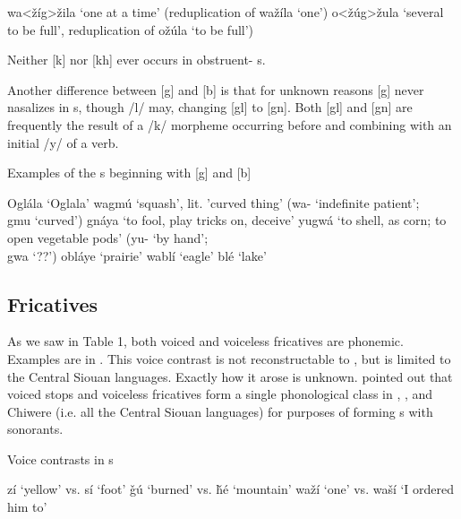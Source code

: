 \documentclass[output=paper]{LSP/langsci}
\begin{document}
\begin{exe}
\ex\label{ex:rood:2}
 \begin{xlist}
\ex wa<\v{z}íg>\v{z}ila `one at a time' (reduplication of wa\v{z}íla `one')
\ex o<\v{z}úg>\v{z}ula `several to be full', reduplication of o\v{z}úla `to be full')
\end{xlist}
\end{exe}

Neither [k] nor [kh] ever occurs in obstruent- s. 

Another difference between [g] and [b] is that for unknown reasons [g] never nasalizes in  s, though /l/ may, changing [gl] to [gn]. Both [gl] and [gn] are frequently the result of a /k/ morpheme occurring before and combining with an initial /y/ of a verb.

\begin{exe}
\ex \label{ex:rood:3}
Examples of the s beginning with [g] and [b]
\begin{xlist}
\ex Oglála `Oglala'
\ex wagmú `squash', lit. 'curved thing' (wa- `indefinite patient'; \\	gmu `curved')
\ex gnáya `to fool, play tricks on, deceive'
\ex yugwá `to shell, as corn; to open vegetable pods' (yu- `by hand'; \\ gwa `??')
\ex obláye `prairie'
\ex wablí `eagle'
\ex blé `lake'
\end{xlist}
\end{exe}

\subsection{Fricatives}

As we saw in Table 1, both voiced and voiceless fricatives are phonemic. Examples are in . This voice contrast is not reconstructable to , but is limited to the Central Siouan languages. Exactly how it arose is unknown. \citet{Miner1979a} pointed out that voiced stops and voiceless fricatives form a single phonological class in , ,  and Chiwere (i.e. all the Central Siouan languages) for purposes of forming s with sonorants.

\begin{exe}
\ex \label{ex:rood:4}
Voice contrasts in  s
\begin{xlist}
\ex zí `yellow' vs. sí `foot'
\ex \v{g}ú `burned' vs. \v{h}é `mountain'
\ex wa\v{z}í `one' vs. wa\v{s}í `I ordered him to'
\end{xlist}
\end{exe}
\end{document}
